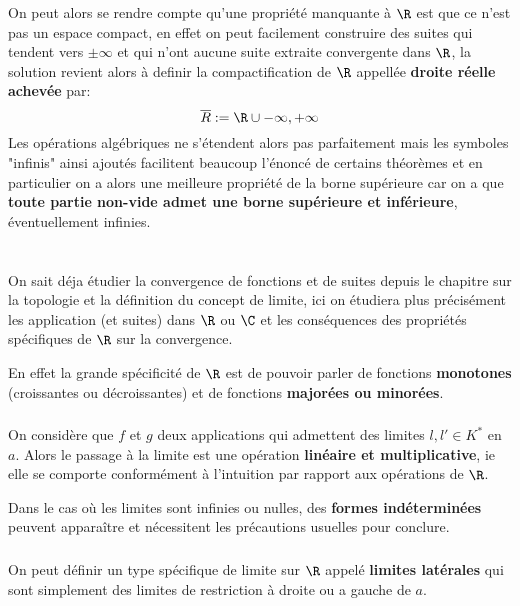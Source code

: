 \subsection*{}
On peut alors se rendre compte qu'une propriété manquante à \(\R\) est que ce n'est pas un espace compact, en effet on peut facilement construire des suites qui tendent vers \(\pm \infty\) et qui n'ont aucune suite extraite convergente dans \(\R\), la solution revient alors à definir la compactification de \(\R\) appellée \textbf{droite réelle achevée} par:
\[
   \overline{R} := \R \cup {-\infty, +\infty}
\]
Les opérations algébriques ne s'étendent alors pas parfaitement mais les symboles "infinis" ainsi ajoutés facilitent beaucoup l'énoncé de certains théorèmes et en particulier on a alors une meilleure propriété de la borne supérieure car on a que \textbf{toute partie non-vide admet une borne supérieure et inférieure}, éventuellement infinies.

\chapter*{} %
On sait déja étudier la convergence de fonctions et de suites depuis le chapitre sur la topologie et la définition du concept de limite, ici on étudiera plus précisément les application (et suites) dans \(\R\) ou \(\C\) et les conséquences des propriétés spécifiques de \(\R\) sur la convergence.\<

En effet la grande spécificité de \(\R\) est de pouvoir parler de fonctions \textbf{monotones} (croissantes ou décroissantes) et de fonctions \textbf{majorées ou minorées}.

\subsection*{}
On considère que \(f\) et \(g\) deux applications qui admettent des limites \(l, l' \in K^*\) en \(a\).\+
Alors le passage à la limite est une opération \textbf{linéaire et multiplicative}, ie elle se comporte conformément à l'intuition par rapport aux opérations de \(\R\).\<

Dans le cas où les limites sont infinies ou nulles, des \textbf{formes indéterminées} peuvent apparaître et nécessitent les précautions usuelles pour conclure.
\subsection*{}
On peut définir un type spécifique de limite sur \(\R\) appelé \textbf{limites latérales} qui sont simplement des limites de restriction à droite ou a gauche de \(a\).\<

